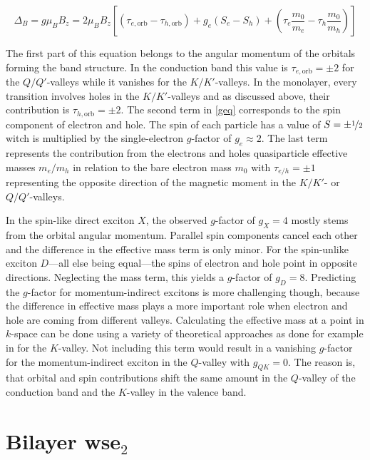 \[\Delta_B=g\mu_BB_z = 2\mu_BB_z\left[(\tau_{e, \mathrm{orb}}-\tau_{h, \mathrm{orb}})+g_e(S_e-S_h) + \left(\tau_e \frac{m_0}{m_e}-\tau_h \frac{m_0}{m_h}\right)\right]\label{geq}\]

The first part of this equation belongs to the angular momentum of the orbitals forming the band structure. In the conduction band this value is $\tau_{e, \mathrm{orb}}=\pm2$ for the $Q/Q'$-valleys while it vanishes for the $K/K'$-valleys. In the monolayer, every transition involves holes in the $K/K'$-valleys and as discussed above, their contribution is $\tau_{h, \mathrm{orb}}=\pm2$. The second term in \eqref{geq} corresponds to the spin component of electron and hole. The spin of each particle has a value of $S=\pm\nicefrac{1}{2}$ witch is multiplied by the single-electron $g$-factor of $g_e\approx2$. The last term represents the contribution from the electrons and holes quasiparticle effective masses $m_e/m_h$ in relation to the bare electron mass $m_0$ with $\tau_{e/h}=\pm1$ representing the opposite direction of the magnetic moment in the $K/K'$- or $Q/Q'$-valleys.

In the spin-like direct exciton $X$, the observed $g$-factor of $g_X=4$ mostly stems from the orbital angular momentum. Parallel spin components cancel each other and the difference in the effective mass term is only minor. For the spin-unlike exciton $D$---all else being equal---the spins of electron and hole point in opposite directions. Neglecting the mass term, this yields a $g$-factor of $g_D=8$. Predicting the $g$-factor for momentum-indirect excitons is more challenging though, because the difference in effective mass plays a more important role when electron and hole are coming from different valleys. Calculating the effective mass at a point in $k$-space can be done using a variety of theoretical approaches as done for example in  \cite{rybkovskiy_atomically_2017} for the $K$-valley. Not including this term would result in a vanishing $g$-factor for the momentum-indirect exciton in the $Q$-valley with $g_{QK}=0$. The reason is, that orbital and spin contributions shift the same amount in the $Q$-valley of the conduction band and the $K$-valley in the valence band. 

\section{Bilayer ws\textup{e}$_2$}\label{bilayer_theory}

